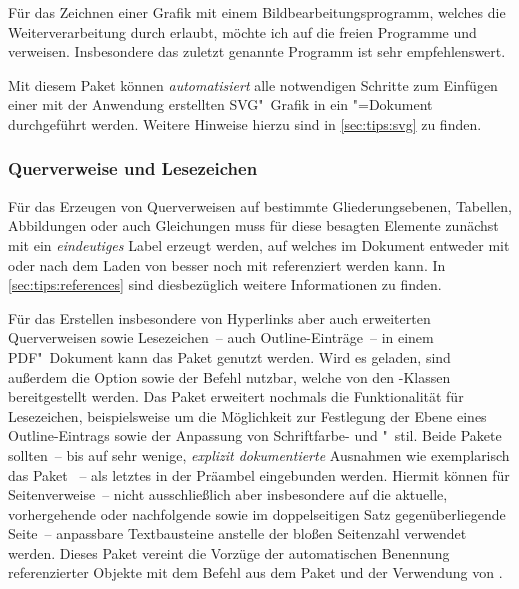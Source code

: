 Für das Zeichnen einer Grafik mit einem Bildbearbeitungsprogramm, welches die 
Weiterverarbeitung durch  erlaubt, möchte ich auf die freien 
Programme  und  verweisen. 
Insbesondere das zuletzt genannte Programm ist sehr empfehlenswert. 

\begin{DeclarePackages}
  Mit diesem Paket können \emph{automatisiert} alle notwendigen Schritte zum 
  Einfügen einer mit der Anwendung  erstellten 
  SVG"~Grafik in ein "=Dokument durchgeführt werden. Weitere 
  Hinweise hierzu sind in \autoref{sec:tips:svg} zu finden.
\end{DeclarePackages}
%
%



\subsubsection{%
  Querverweise und Lesezeichen%
}
%
Für das Erzeugen von Querverweisen auf bestimmte Gliederungsebenen, Tabellen, 
Abbildungen oder auch Gleichungen muss für diese besagten Elemente zunächst mit 
 ein \emph{eindeutiges} Label erzeugt werden, auf 
welches im Dokument entweder mit  oder nach dem Laden von 
 besser noch mit  referenziert werden kann. In 
\autoref{sec:tips:references} sind diesbezüglich weitere Informationen zu 
finden.

\begin{DeclarePackages}
  Für das Erstellen insbesondere von Hyperlinks aber auch erweiterten 
  Querverweisen sowie Lesezeichen~-- auch Outline-Einträge~-- in einem 
  PDF"~Dokument kann das Paket  genutzt werden. Wird 
  es geladen, sind außerdem die Option  sowie der Befehl 
   nutzbar, welche von den \TUDScript-Klassen bereitgestellt 
  werden. Das Paket  erweitert nochmals die Funktionalität 
  für Lesezeichen, beispielsweise um die Möglichkeit zur Festlegung der Ebene 
  eines Outline-Eintrags sowie der Anpassung von Schriftfarbe- und "~stil.
  Beide Pakete sollten~-- bis auf sehr wenige, \emph{explizit dokumentierte} 
  Ausnahmen wie exemplarisch das Paket ~-- als letztes in 
  der Präambel eingebunden werden.
  Hiermit können für Seitenverweise~-- nicht ausschließlich aber insbesondere 
  auf die aktuelle, vorhergehende oder nachfolgende sowie im doppelseitigen 
  Satz gegenüberliegende Seite~-- anpassbare Textbausteine anstelle der bloßen 
  Seitenzahl verwendet werden.
  Dieses Paket vereint die Vorzüge der automatischen Benennung referenzierter 
  Objekte mit dem Befehl  aus dem Paket  und 
  der Verwendung von .
\end{DeclarePackages}
%
%



